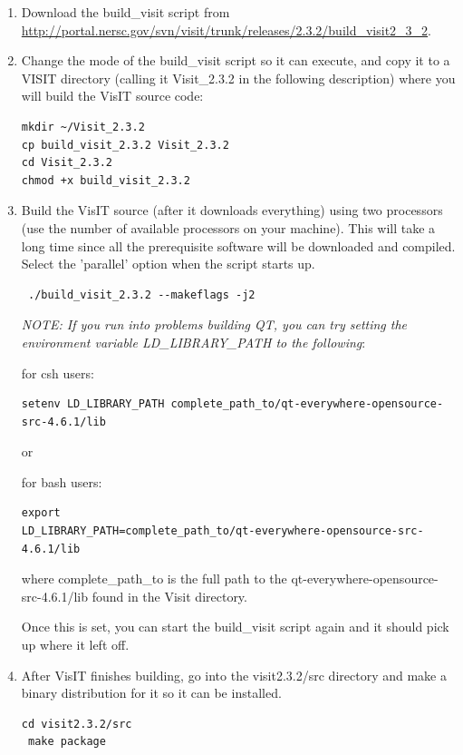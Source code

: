 \documentclass[12pt]{article}
\begin{document}
\begin{enumerate}
\item Download the build\_visit script from
  \url{http://portal.nersc.gov/svn/visit/trunk/releases/2.3.2/build_visit2_3_2}.



\item Change the mode of the build\_visit script so it can execute, and
  copy it to a VISIT directory (calling it Visit\_2.3.2 in the
  following description) where you will build the VisIT source code:
\begin{verbatim}
mkdir ~/Visit_2.3.2
cp build_visit_2.3.2 Visit_2.3.2
cd Visit_2.3.2
chmod +x build_visit_2.3.2
\end{verbatim}

\item Build the VisIT source (after it downloads everything) using two
  processors (use the number of available processors on your
  machine). This will take a long time since all the prerequisite
  software will be downloaded and compiled. Select the 'parallel'
  option when the script starts up. 

\begin{verbatim}
 ./build_visit_2.3.2 --makeflags -j2 
\end{verbatim}

\emph{NOTE: If you run into problems building QT, you can try setting
  the environment variable LD\_LIBRARY\_PATH to the following}:

for csh users:
\begin{verbatim}
setenv LD_LIBRARY_PATH complete_path_to/qt-everywhere-opensource-src-4.6.1/lib
\end{verbatim}

or

for bash users:
\begin{verbatim}
export
LD_LIBRARY_PATH=complete_path_to/qt-everywhere-opensource-src-4.6.1/lib
\end{verbatim}

where complete\_path\_to is the full path to the
qt-everywhere-opensource-src-4.6.1/lib found in the Visit directory.

Once this is set, you can start the build\_visit script again and it
should pick up where it left off.

\item After VisIT finishes building, go into the visit2.3.2/src
  directory and make a binary distribution for it so it can be
  installed.  
\begin{verbatim}
cd visit2.3.2/src
 make package 
\end{verbatim}


\end{enumerate}
\end{document}
